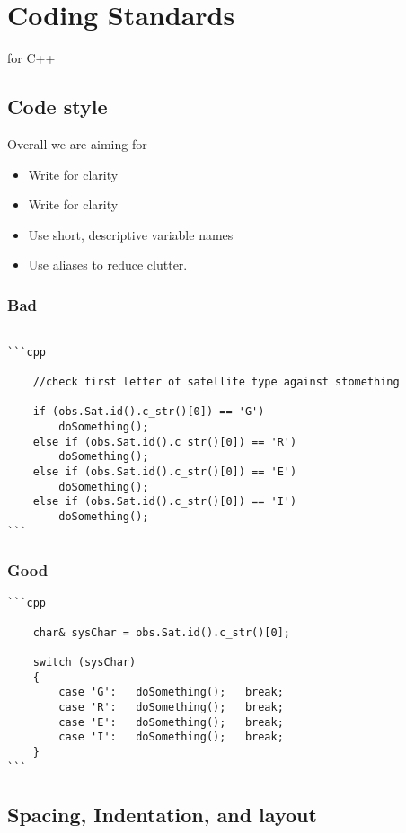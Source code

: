 \chapter{Coding Standards}
\label{ch:coding_standards}

 for C++

\section{Code style}
Overall we are aiming for
\begin{itemize}
	\item  Write for clarity
	\item  Write for clarity
	\item  Use short, descriptive variable names
	\item  Use aliases to reduce clutter.
\end{itemize}

\subsection{Bad}
\begin{verbatim}

```cpp

    //check first letter of satellite type against stomething

    if (obs.Sat.id().c_str()[0]) == 'G') 
        doSomething(); 
    else if (obs.Sat.id().c_str()[0]) == 'R')
        doSomething();
    else if (obs.Sat.id().c_str()[0]) == 'E')
        doSomething();
    else if (obs.Sat.id().c_str()[0]) == 'I')
        doSomething();
```
\end{verbatim}

\subsection{Good}

\begin{verbatim}
```cpp

    char& sysChar = obs.Sat.id().c_str()[0];

    switch (sysChar)
    {
        case 'G':   doSomething();   break;
        case 'R':   doSomething();   break;
        case 'E':   doSomething();   break;
        case 'I':   doSomething();   break;
    }
```
\end{verbatim}


\section{Spacing, Indentation, and layout}

